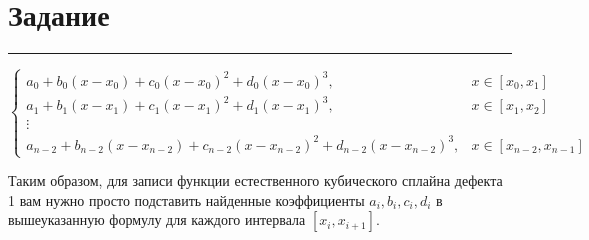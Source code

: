\documentclass[a4paper, 14pt]{extarticle}
\begin{document}


\section*{Задание}\vspace{-20pt}\rule{\linewidth}{0.1mm}

\begin{equation*}
    \begin{cases}
        a_0 + b_0 (x - x_0) + c_0 (x - x_0)^2 + d_0 (x - x_0)^3, & x \in [x_0, x_1] \\ 
        a_1 + b_1 (x - x_1) + c_1 (x - x_1)^2 + d_1 (x - x_1)^3, & x \in [x_1, x_2] \\ 
        \vdots \\ 
        a_{n-2} + b_{n-2} (x - x_{n-2}) + c_{n-2} (x - x_{n-2})^2 + d_{n-2} (x - x_{n-2})^3, & x \in [x_{n-2}, x_{n-1}] 
    \end{cases}   
\end{equation*}

Таким образом, для записи функции естественного кубического сплайна дефекта 1 вам нужно просто подставить найденные коэффициенты $ a_i, b_i, c_i, d_i $ в 
вышеуказанную формулу для каждого интервала $[x_i, x_{i+1}]$.
\end{document}
